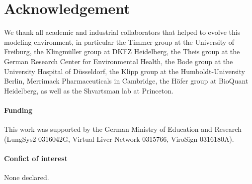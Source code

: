 \documentclass{bioinfo}
\begin{document}
\section*{Acknowledgement}
We thank all academic and industrial collaborators that helped to evolve this modeling 
environment, in particular the Timmer group at the University of Freiburg, the Klingm\"uller group at DKFZ Heidelberg, the Theis group at the German 
Research Center for Environmental Health, the Bode group at the University Hospital of D\"usseldorf, the Klipp group at the Humboldt-University Berlin, Merrimack Pharmaceuticals in Cambridge, the H\"ofer group at BioQuant Heidelberg, as well as the Shvartsman lab at Princeton. 

\paragraph{Funding\textcolon} 
This work was supported by the German Ministry of Education and Research (LungSys2 
0316042G, Virtual Liver Network 0315766, ViroSign 0316180A).

\paragraph{Confict of interest\textcolon} None declared.



\end{document}
